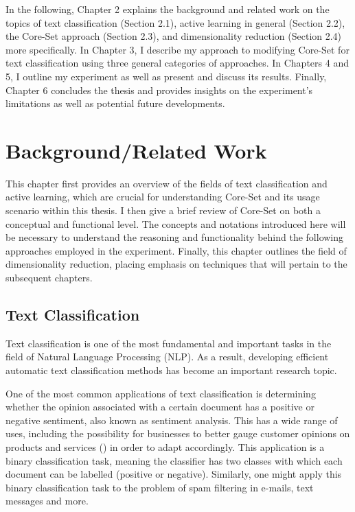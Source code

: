 \documentclass[english,bachelor,ul]{webisthesis} %
\begin{document}
In the following, Chapter 2 explains the background and related work on the topics of text classification (Section 2.1), active learning in general (Section 2.2), the Core-Set approach (Section 2.3), and dimensionality reduction (Section 2.4) more specifically. In Chapter 3, I describe my approach to modifying Core-Set for text classification using three general categories of approaches. In Chapters 4 and 5, I outline my experiment as well as present and discuss its results. Finally, Chapter 6 concludes the thesis and provides insights on the experiment's limitations as well as potential future developments. 

\chapter{Background/Related Work}

This chapter first provides an overview of the fields of text classification and active learning, which are crucial for understanding Core-Set and its usage scenario within this thesis. I then give a brief review of Core-Set on both a conceptual and functional level. The concepts and notations introduced here will be necessary to understand the reasoning and functionality behind the following approaches employed in the experiment. Finally, this chapter outlines the field of dimensionality reduction, placing emphasis on techniques that will pertain to the subsequent chapters.

\section{Text Classification}

Text classification is one of the most fundamental and important tasks in the field of Natural Language Processing (NLP). As a result, developing efficient automatic text classification methods has become an important research topic. 

One of the most common applications of text classification is determining whether the opinion associated with a certain document has a positive or negative sentiment, also known as sentiment analysis. This has a wide range of uses, including the possibility for businesses to better gauge customer opinions on products and services (\cite{DBLP:books/sp/mining2012/LiuZ12}) in order to adapt accordingly. This application is a binary classification task, meaning the classifier has two classes with which each document can be labelled (positive or negative). Similarly, one might apply this binary classification task to the problem of spam filtering in e-mails, text messages and more. 
\end{document}
